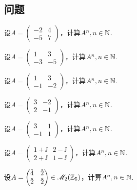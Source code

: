 \subsection{问题}
\begin{problem}
  设$A=\begin{pmatrix}
    -2 & 4 \\
    -5 & 7
  \end{pmatrix}$，计算$A^n,n\in\mathbb N$.
\end{problem}

\begin{problem}
  设$A=\begin{pmatrix}
    1 & 3 \\
    -3 & -5
  \end{pmatrix}$，计算$A^n,n\in\mathbb N$.
\end{problem}

\begin{problem}
  设$A=\begin{pmatrix}
    1 & 3 \\
    -1 & -2
  \end{pmatrix}$，计算$A^n,n\in\mathbb N$.
\end{problem}

\begin{problem}
  设$A=\begin{pmatrix}
    3 & -2 \\
    2 & -1
  \end{pmatrix}$，计算$A^n,n\in\mathbb N$.
\end{problem}

\begin{problem}
  设$A=\begin{pmatrix}
    3 & 1 \\
    -1 & 1
  \end{pmatrix}$，计算$A^n,n\in\mathbb N$.
\end{problem}

\begin{problem}
  设$A=\begin{pmatrix}
    1 + \ii & 2 - \ii \\
    2 + \ii & 1 - \ii
  \end{pmatrix}$，计算$A^n,n\in\mathbb N$.
\end{problem}

\begin{problem}
  设$A=\begin{pmatrix}
    \hat4 & \hat2 \\
    \hat2 & \hat2
  \end{pmatrix}\in\mathscr M_2(\mathbb Z_5)$，计算$A^n,n\in\mathbb N$.
\end{problem}

